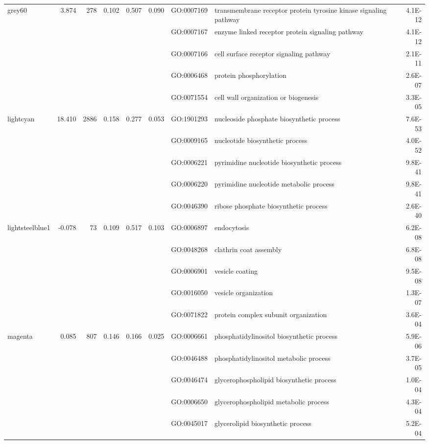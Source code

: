 \begin{landscape}
\begin{table}[ht]
\begin{tabular}{|l|rrrrrlP{5cm}r|}
 grey60 & 3.874 & 278 & 0.102 & 0.507 & 0.090 & GO:0007169 & transmembrane receptor protein tyrosine kinase signaling pathway & 4.1E-12 \\ 
   &  &  &  &  &  & GO:0007167 & enzyme linked receptor protein signaling pathway & 4.1E-12 \\ 
   &  &  &  &  &  & GO:0007166 & cell surface receptor signaling pathway & 2.1E-11 \\ 
   &  &  &  &  &  & GO:0006468 & protein phosphorylation & 2.6E-07 \\ 
   &  &  &  &  &  & GO:0071554 & cell wall organization or biogenesis & 3.3E-05 \\ 
\hline 
 lightcyan & 18.410 & 2886 & 0.158 & 0.277 & 0.053 & GO:1901293 & nucleoside phosphate biosynthetic process & 7.6E-53 \\ 
   &  &  &  &  &  & GO:0009165 & nucleotide biosynthetic process & 4.0E-52 \\ 
   &  &  &  &  &  & GO:0006221 & pyrimidine nucleotide biosynthetic process & 9.8E-41 \\ 
   &  &  &  &  &  & GO:0006220 & pyrimidine nucleotide metabolic process & 9.8E-41 \\ 
   &  &  &  &  &  & GO:0046390 & ribose phosphate biosynthetic process & 2.6E-40 \\ 
\hline 
 lightsteelblue1 & -0.078 & 73 & 0.109 & 0.517 & 0.103 & GO:0006897 & endocytosis & 6.2E-08 \\ 
   &  &  &  &  &  & GO:0048268 & clathrin coat assembly & 6.8E-08 \\ 
   &  &  &  &  &  & GO:0006901 & vesicle coating & 9.5E-08 \\ 
   &  &  &  &  &  & GO:0016050 & vesicle organization & 1.3E-07 \\ 
   &  &  &  &  &  & GO:0071822 & protein complex subunit organization & 3.6E-04 \\ 
\hline 
 magenta & 0.085 & 807 & 0.146 & 0.166 & 0.025 & GO:0006661 & phosphatidylinositol biosynthetic process & 5.9E-06 \\ 
   &  &  &  &  &  & GO:0046488 & phosphatidylinositol metabolic process & 3.7E-05 \\ 
   &  &  &  &  &  & GO:0046474 & glycerophospholipid biosynthetic process & 1.0E-04 \\ 
   &  &  &  &  &  & GO:0006650 & glycerophospholipid metabolic process & 4.3E-04 \\ 
   &  &  &  &  &  & GO:0045017 & glycerolipid biosynthetic process & 5.2E-04 \\ 
\hline 
\end{tabular}
\end{table}



\end{landscape}
